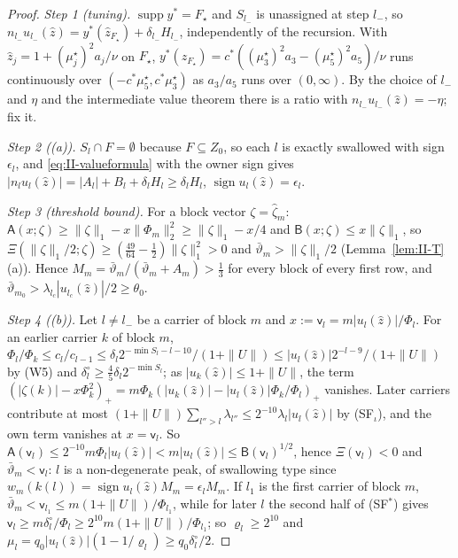 \documentclass[10pt]{amsart}
\theoremstyle{definition}
\theoremstyle{remark}
\newcommand{\supp}{\operatorname{supp}}
\newcommand{\sgn}{\operatorname{sign}}
\newcommand{\zh}{\hat z}
\begin{document}
\begin{proof}
\emph{Step 1 (tuning).}  $\supp y^*=F_\star$ and $S_{l_-}$ is unassigned at step
$l_-$, so $n_{l_-}u_{l_-}(\zh)=y^*(\zh_{F_\star})+\delta_{l_-}H_{l_-}$, independently
of the recursion.  With $\zh_j=1+(\mu^\star_j)^2a_j/\nu$ on $F_\star$, $y^*(\zh_{F_\star})
=c^*((\mu^\star_3)^2a_3-(\mu^\star_5)^2a_5)/\nu$ runs continuously over
$(-c^*\mu^\star_5,c^*\mu^\star_3)$ as $a_3/a_5$ runs over $(0,\infty)$.  By the
choice of $l_-$ and $\eta$ and the intermediate value theorem there is a
ratio with $n_{l_-}u_{l_-}(\zh)=-\eta$; fix it.

\emph{Step 2 ((a)).}  $S_l\cap F=\emptyset$ because $F\subseteq Z_0$, so each
$l$ is exactly swallowed with sign $\epsilon_l$, and
\eqref{eq:II-valueformula} with the owner sign gives $|n_lu_l(\zh)|=|A_l|+B_l+
\delta_lH_l\ge\delta_lH_l$, $\sgn u_l(\zh)=\epsilon_l$.

\emph{Step 3 (threshold bound).}  For a block vector $\zeta=\hat\zeta_m$:
$\mathsf A(x;\zeta)\ge\|\zeta\|_1-x\|\Phi_m\|_2^2\ge\|\zeta\|_1-x/4$ and $\mathsf
B(x;\zeta)\le x\|\zeta\|_1$, so $\Xi(\|\zeta\|_1/2;\zeta)\ge(\frac{49}{64}-\frac12)
\|\zeta\|_1^2>0$ and $\bar\vartheta_m>\|\zeta\|_1/2$ (Lemma~\ref{lem:II-T}(a)).
Hence $M_m=\bar\vartheta_m/(\bar\vartheta_m+A_m)>\frac13$ for every block of
every first row, and $\bar\vartheta_{m_0}>\lambda_{l_c}|u_{l_c}(\zh)|/2\ge\theta_0$.

\emph{Step 4 ((b)).}  Let $l\ne l_-$ be a carrier of block $m$ and $x:=\mathsf
v_l=m|u_l(\zh)|/\Phi_l$.  For an earlier carrier $k$ of block $m$,
$\Phi_l/\Phi_k\le c_l/c_{l-1}\le\delta_l2^{-\min S_l-l-10}/(1+\|U\|)\le|u_l(\zh)|
2^{-l-9}/(1+\|U\|)$ by (W5) and $\delta^\circ_l\ge\frac45\delta_l2^{-\min S_l}$;
as $|u_k(\zh)|\le1+\|U\|$, the term $(|\zeta(k)|-x\Phi_k^2)_+=m\Phi_k(|u_k(\zh)|-
|u_l(\zh)|\Phi_k/\Phi_l)_+$ vanishes.  Later carriers contribute at most
$(1+\|U\|)\sum_{l''>l}\lambda_{l''}\le2^{-10}\lambda_l|u_l(\zh)|$ by (SF$_\iota$),
and the own term vanishes at $x=\mathsf v_l$.  So $\mathsf A(\mathsf v_l)\le
2^{-10}m\Phi_l|u_l(\zh)|<m|u_l(\zh)|\le\mathsf B(\mathsf v_l)^{1/2}$, hence
$\Xi(\mathsf v_l)<0$ and $\bar\vartheta_m<\mathsf v_l$: $l$ is a non-degenerate
peak, of swallowing type since $w_m(k(l))=\sgn u_l(\zh)M_m=\epsilon_lM_m$.  If
$l_1$ is the first carrier of block $m$, $\bar\vartheta_m<\mathsf v_{l_1}\le
m(1+\|U\|)/\Phi_{l_1}$, while for later $l$ the second half of (SF$^*$) gives
$\mathsf v_l\ge m\delta^\circ_l/\Phi_l\ge2^{10}m(1+\|U\|)/\Phi_{l_1}$; so
$\varrho_l\ge2^{10}$ and $\mu_l=q_0|u_l(\zh)|(1-1/\varrho_l)\ge q_0\delta^\circ_l/2$.


\end{proof}
\end{document}

